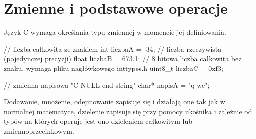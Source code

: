 % 
% 
% 
% 

\section{Zmienne i podstawowe operacje}

Język C wymaga określania typu zmiennej w momencie jej definiowania.

\begin{CodeFrame*}[c]{}
// liczba całkowita ze znakiem
int     liczbaA = -34;
// liczba rzeczywista (pojedynczej precyzji)
float   liczbaB = 673.1;
// 8 bitowa liczba całkowita bez znaku, wymaga pliku nagłówkowego inttypes.h
uint8_t liczbaC = 0xf3;

// zmienna napisowa "C NULL-end string"
char* napisA = "q we";
\end{CodeFrame*}

Dodawanie, mnożenie, odejmowanie zapisuje się i działają one tak jak w normalnej matematyce, dzielenie zapisuje się przy pomocy ukośnika i zależnie od typów na których operuje jest ono dzieleniem całkowitym lub zmiennoprzecinkowym.

